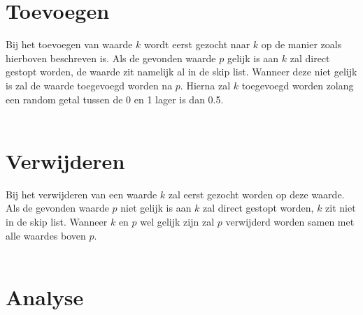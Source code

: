 \section{Toevoegen}
Bij het toevoegen van waarde $k$ wordt eerst gezocht naar $k$ op de manier zoals hierboven beschreven is. Als de gevonden waarde $p$ gelijk is aan $k$ zal direct gestopt worden, de waarde zit namelijk al in de skip list. Wanneer deze niet gelijk is zal de waarde toegevoegd worden na $p$. Hierna zal $k$ toegevoegd worden zolang een random getal tussen de 0 en 1 lager is dan 0.5.\\
\\
\section{Verwijderen}
Bij het verwijderen van een waarde $k$ zal eerst gezocht worden op deze waarde. Als de gevonden waarde $p$ niet gelijk is aan $k$ zal direct gestopt worden, $k$ zit niet in de skip list. Wanneer $k$ en $p$ wel gelijk zijn zal $p$ verwijderd worden samen met alle waardes boven $p$.\\
\\
\section{Analyse}

